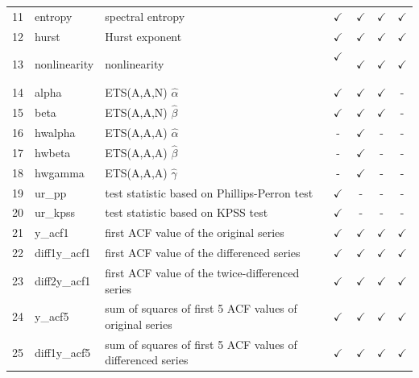\documentclass[11pt,a4paper,]{article}
\def\yes{$\checkmark$}
\begin{document}
\begin{table}[!htp]
\begin{tabular}{llp{}cccc}
11 & entropy        & spectral entropy                                                                        & \yes  & \yes & \yes & \yes\\
12 & hurst          & Hurst exponent                                                                          & \yes  & \yes & \yes & \yes\\
13 & nonlinearity   & nonlinearity                                                                            & \yes\ & \yes & \yes & \yes\\
14 & alpha          & ETS(A,A,N) $\hat\alpha$                                                                 & \yes  & \yes & \yes & -\\
15 & beta           & ETS(A,A,N) $\hat\beta$                                                                  & \yes  & \yes & \yes & - \\
16 & hwalpha        & ETS(A,A,A) $\hat\alpha$                                                                 & -     & \yes & - & -\\
17 & hwbeta         & ETS(A,A,A) $\hat\beta$                                                                  & -     & \yes & - & - \\
18 & hwgamma        & ETS(A,A,A) $\hat\gamma$                                                                 & -     & \yes & - &-\\
19 & ur\_pp         & test statistic based on Phillips-Perron test                                            & \yes  & - & - & - \\
20 & ur\_kpss       & test statistic based on KPSS test                                                       & \yes  & - & - & - \\
21 & y\_acf1        & first ACF value of the original series                                                  & \yes  & \yes & \yes & \yes\\
22 & diff1y\_acf1   & first ACF value of the differenced series                                               & \yes  & \yes & \yes & \yes\\
23 & diff2y\_acf1   & first ACF value of the twice-differenced series                                         & \yes  & \yes & \yes & \yes\\
24 & y\_acf5        & sum of squares of first 5 ACF values of original series                                 & \yes  & \yes & \yes & \yes\\
25 & diff1y\_acf5   & sum of squares of first 5 ACF values of differenced series                              & \yes  & \yes & \yes & \yes\\

\end{tabular}
\end{table}
\end{document}
